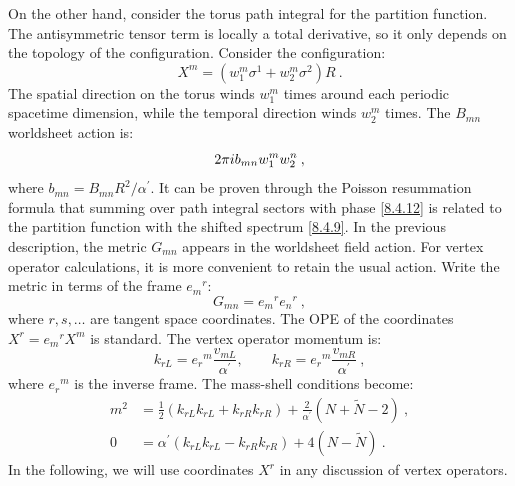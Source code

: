 On the other hand, consider the torus path integral for the partition function. The antisymmetric tensor term is locally a total derivative, so it only depends on the topology of the configuration. Consider the configuration:
\begin{equation}
	X^{m}=(w_{1}^{m} \sigma^{1}+w_{2}^{m} \sigma^{2}) R \:. \label{8.4.11}
\end{equation}
The spatial direction on the torus winds $w_{1}^{m}$ times around each periodic spacetime dimension, while the temporal direction winds $w_{2}^{m}$ times. 
The $B_{m n}$ worldsheet action is:
\begin{equation}
	2 \pi i b_{m n} w_{1}^{m} w_{2}^{n} \:, \label{8.4.12}
\end{equation}
where $b_{m n}=B_{m n} R^{2} / \alpha^{\prime}$. It can be proven through the Poisson resummation formula that summing over path integral sectors with phase \eqref{8.4.12} is related to the partition function with the shifted spectrum \eqref{8.4.9}. 
In the previous description, the metric $G_{m n}$ appears in the worldsheet field action. For vertex operator calculations, it is more convenient to retain the usual action. Write the metric in terms of the frame $e_{m}{}^{r}$:
\begin{equation}
	G_{m n}=e_{m}{}^{r} e_{n}{}^{r} \:, \label{8.4.13}
\end{equation}
where $r, s, \ldots$ are tangent space coordinates. The OPE of the coordinates $X^{r}=e_{m}{}^{r} X^{m}$ is standard. 
The vertex operator momentum is:
\begin{equation}
	k_{r L}=e_{r}{}^{m} \frac{v_{m L}}{\alpha^{\prime}}, \qquad k_{r R}=e_{r}{}^{m} \frac{v_{m R}}{\alpha^{\prime}} \:, \label{8.4.14}
\end{equation}
where $e_{r}{}^{m} $ is the inverse frame.
The mass-shell conditions become:
\begin{subequations} \label{8.4.15}
	\begin{align}
		m^{2} &=\frac{1}{2}(k_{r L} k_{r L}+k_{r R} k_{r R})+\frac{2}{\alpha^{\prime}}(N+\tilde{N}-2) \:, \label{8.4.15a} \\	
		0 &= \alpha^{\prime}(k_{r L} k_{r L}-k_{r R} k_{r R})+4(N-\tilde{N}) \:. \label{8.4.15b}
	\end{align}
\end{subequations}
In the following, we will use coordinates $X^{r}$ in any discussion of vertex operators.

